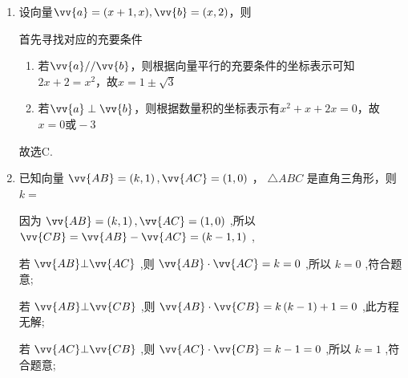 \begin{enumerate}
\begin{enumerate}
\begin{jieda}
            $(\vv{a} + \lambda \vv{b}) = (1+\lambda, 1-\lambda), (\vv{a} + \mu \vv{b}) = (1+\mu, 1-\mu)$，根据向量垂直可知其数量积为0，故有$(1+\lambda)(1+\mu) + (1-\lambda)(1-\mu) = 2+2\lambda \mu = 0$，对应D.
        \end{jieda}
        \item 设向量$\vv{a} = (x+1, x), \vv{b} = (x, 2)$，则
        \begin{jieda}
            首先寻找对应的充要条件
            \begin{enumerate}
                \item 若$\vv{a} // \vv{b}$，则根据向量平行的充要条件的坐标表示可知$2x+2 = x^2$，故$x = 1 \pm \sqrt{3}$
                \item 若$\vv{a} \perp \vv{b}$，则根据数量积的坐标表示有$x^2+x + 2x = 0$，故$x = 0 \mbox{或} -3$
            \end{enumerate}
            故选C.
        \end{jieda}
        \item 已知向量 $\vv{AB} = \left( {k,1}\right) ,\vv{AC} = \left( {1,0}\right)$ ， $\bigtriangleup  {ABC}$ 是直角三角形，则 $k =$ 
        \begin{jieda}
            因为 $\vv{AB} = \left( {k,1}\right) ,\vv{AC} = \left( {1,0}\right)$ ,所以 $\vv{CB} = \vv{AB} - \vv{AC} = \left( {k - 1,1}\right)$ ,
            
            若 $\vv{AB} \bot  \vv{AC}$ ,则 $\vv{AB} \cdot  \vv{AC} = k = 0$ ,所以 $k = 0$ ,符合题意;
            
            若 $\vv{AB} \bot  \vv{CB}$ ,则 $\vv{AB} \cdot  \vv{CB} = k\left( {k - 1}\right)  + 1 = 0$ ,此方程无解;
            
            若 $\vv{AC} \bot  \vv{CB}$ ,则 $\vv{AC} \cdot  \vv{CB} = k - 1 = 0$ ,所以 $k = 1$ ,符合题意;
            

\end{jieda}
\end{enumerate}
\end{enumerate}
